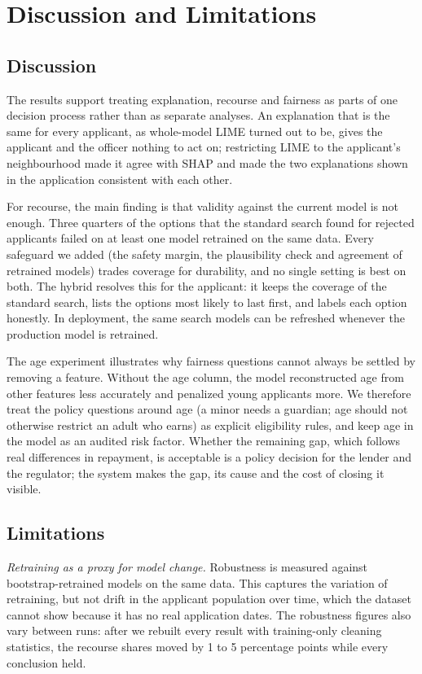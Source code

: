 \section{Discussion and Limitations}
\label{sec:discussion}

\subsection{Discussion}
The results support treating explanation, recourse and fairness as parts of one decision process rather than as
separate analyses. An explanation that is the same for every applicant, as whole-model LIME turned out to be, gives the
applicant and the officer nothing to act on; restricting LIME to the applicant's neighbourhood made it agree with SHAP
and made the two explanations shown in the application consistent with each other.

For recourse, the main finding is that validity against the current model is not enough. Three quarters of the
options that the standard search found for rejected applicants failed on at least one model retrained on the same
data. Every safeguard we added (the safety margin, the plausibility check and agreement of retrained models) trades
coverage for durability, and no single setting is best on both. The hybrid resolves this for the applicant: it keeps
the coverage of the standard search, lists the options most likely to last first, and labels each option honestly. In
deployment, the same search models can be refreshed whenever the production model is retrained.

The age experiment illustrates why fairness questions cannot always be settled by removing a feature. Without the
age column, the model reconstructed age from other features less accurately and penalized young applicants more. We
therefore treat the policy questions around age (a minor needs a guardian; age should not otherwise restrict an adult
who earns) as explicit eligibility rules, and keep age in the model as an audited risk factor. Whether the remaining
gap, which follows real differences in repayment, is acceptable is a policy decision for the lender and the regulator;
the system makes the gap, its cause and the cost of closing it visible.

\subsection{Limitations}
\emph{Retraining as a proxy for model change.} Robustness is measured against bootstrap-retrained models on the same
data. This captures the variation of retraining, but not drift in the applicant population over time, which the dataset
cannot show because it has no real application dates. The robustness figures also vary between runs: after we rebuilt
every result with training-only cleaning statistics, the recourse shares moved by 1 to 5 percentage points while every
conclusion held.

